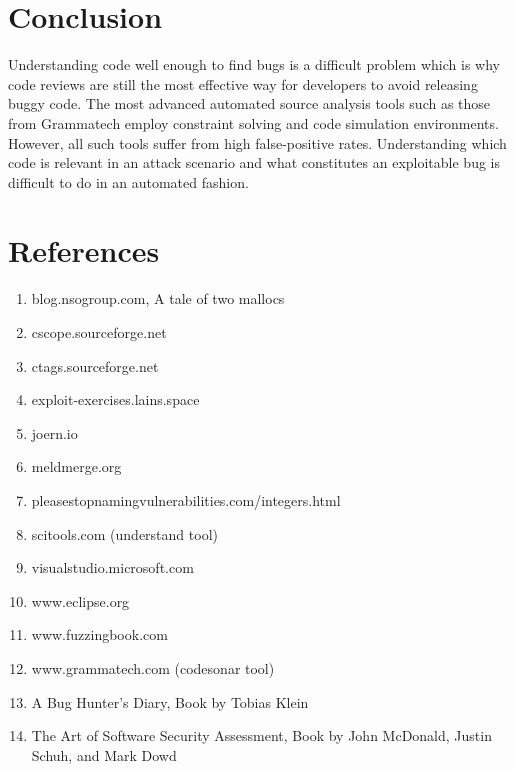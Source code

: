 \documentclass[12pt]{Training}
\begin{document}

\section*{Conclusion}
Understanding code well enough to find bugs is a difficult problem which is why code reviews are still the most effective way for developers to avoid releasing buggy code. The most advanced automated source analysis tools such as those from Grammatech employ constraint solving and code simulation environments. However, all such tools suffer from high false-positive rates. Understanding which code is relevant in an attack scenario and what constitutes an exploitable bug is difficult to do in an automated fashion.

\section*{References}
\begin{enumerate}
	\item blog.nsogroup.com, A tale of two mallocs
	\item cscope.sourceforge.net
	\item ctags.sourceforge.net
    \item exploit-exercises.lains.space
	\item joern.io
	\item meldmerge.org
	\item pleasestopnamingvulnerabilities.com/integers.html
	\item scitools.com (understand tool)
	\item visualstudio.microsoft.com
	\item www.eclipse.org
	\item www.fuzzingbook.com
	\item www.grammatech.com (codesonar tool)
	\item A Bug Hunter's Diary, Book by Tobias Klein
	\item The Art of Software Security Assessment, Book by John McDonald, Justin Schuh, and Mark Dowd
\end{enumerate}
\end{document}

